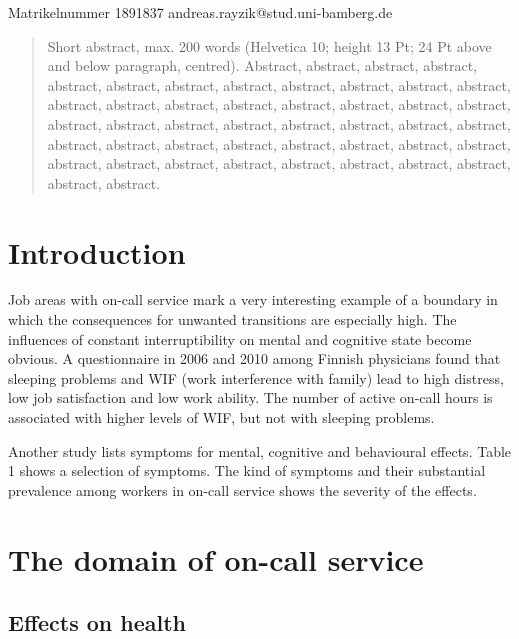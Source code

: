 \documentclass{CML_Seminar_Template}
\begin{document}

\author{Andreas Rayzik}
       {Matrikelnummer 1891837}
       {andreas.rayzik@stud.uni-bamberg.de}

\begin{abstract}
Short abstract, max. 200 words  (Helvetica 10; height 13 Pt; 24 Pt above and below paragraph, centred). Abstract, abstract, abstract, abstract, abstract, abstract, abstract, abstract, abstract, abstract, abstract, abstract, abstract, abstract, abstract, abstract, abstract, abstract, abstract, abstract, abstract, abstract, abstract, abstract, abstract, abstract, abstract, abstract, abstract, abstract, abstract, abstract, abstract, abstract, abstract, abstract, abstract, abstract, abstract, abstract, abstract, abstract, abstract, abstract, abstract, abstract. 
\end{abstract}

\vspace{24pt}

\section{Introduction}

Job areas with on-call service mark a very interesting example of a boundary in which the consequences for unwanted transitions are especially high. The influences of constant interruptibility on mental and cognitive state become obvious. A questionnaire in 2006 and 2010 among Finnish physicians found that sleeping problems and WIF (work interference with family) lead to high distress, low job satisfaction and low work ability. The number of active on-call hours is associated with higher levels of WIF, but not with sleeping problems.
\par
Another study lists symptoms for mental, cognitive and behavioural effects. Table 1 shows a selection of symptoms. The kind of symptoms and their substantial prevalence among workers in on-call service shows the severity of the effects.

\section{The domain of on-call service}

\subsection{Effects on health}
\end{document}
